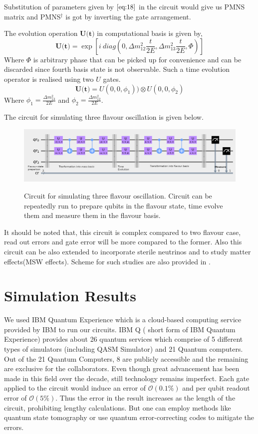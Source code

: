 \documentclass[12pt,a4paper]{report}
\begin{document}
Substitution of parameters given by $\ref{eq:18}$ in the circuit would give us PMNS matrix and PMNS$^{\dagger}$ is got by inverting the gate arrangement.\par
The evolution operation $\textbf{U(t)}$ in computational basis is given by,
\begin{equation}
\textbf{U(t)}=\exp [i \ diag(0,\Delta m_{12}^{2}\frac{t}{2E}, \Delta m_{13}^{2}\frac{t}{2E},\Phi)]
\end{equation}
Where $\Phi$ is arbitrary phase that can be picked up for convenience and can be discarded since fourth basis state is not observable. Such a time evolution operator is realised using two $U$ gates.
\begin{equation}
\textbf{U(t)}= U(0,0,\phi_{1})) \otimes U(0,0,\phi_{2})
\end{equation}
Where $\phi_{1}=\frac{\Delta m_{13}^{2}}{2E}$ and $\phi_{2}=\frac{\Delta m_{12}^{2}}{2E}$.\par
The circuit for simulating three flavour oscillation is given below.
\begin{figure}[h]
\graphicspath{ {./Images/} }
\centering	
{\includegraphics[scale=0.5]{fig_4.png}}
\caption{Circuit for simulating three flavour oscillation\cite{jones}. Circuit can be repeatedly run to prepare qubits in the flavour state, time evolve them and measure them in the flavour basis.}
\label{fig 4}
\end{figure}

It should be noted that, this circuit is complex compared to two flavour case, read out errors and gate error will be more compared to the former. Also this circuit can be also extended to incorporate sterile neutrinos and to study matter effects(MSW effects). Scheme for such studies are also provided in \cite{jones}.
\newpage
\thispagestyle{empty}
\mbox{}
\newpage
\chapter{Simulation Results}
We used IBM Quantum Experience which is a cloud-based computing service provided by IBM to run our circuits. IBM Q ( short form of IBM Quantum Experience) provides about 26 quantum services which comprise of 5 different types of simulators (including QASM Simulator) and 21 Quantum computers. Out of the 21 Quantum Computers, 8 are publicly accessible and the remaining are exclusive for the collaborators. Even though great advancement has been made in this field over the decade, still technology remains imperfect. Each gate applied to the circuit would induce an error of $\mathcal{O}(0.1\%)$ and per qubit readout error of $\mathcal{O}(5\%)$. Thus the error in the result increases as the length of the circuit, prohibiting lengthy calculations. But one can employ methods like quantum state tomography or use quantum error-correcting codes to mitigate the errors. 
\end{document}
